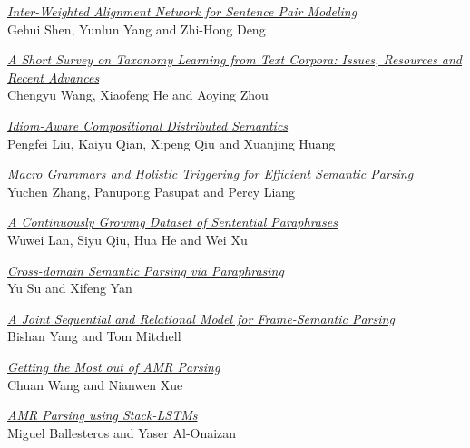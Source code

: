 \hyperlink{page.1188}{\em Inter-Weighted Alignment Network for Sentence Pair Modeling}\samepage \\
\hspace*{7mm} Gehui Shen, Yunlun Yang and Zhi-Hong Deng\dotfill {}

\hyperlink{page.1199}{\em A Short Survey on Taxonomy Learning from Text Corpora: Issues, Resources and Recent Advances}\samepage \\
\hspace*{7mm} Chengyu Wang, Xiaofeng He and Aoying Zhou\dotfill {}

\hyperlink{page.1213}{\em Idiom-Aware Compositional Distributed Semantics}\samepage \\
\hspace*{7mm} Pengfei Liu, Kaiyu Qian, Xipeng Qiu and Xuanjing Huang\dotfill {}

\hyperlink{page.1223}{\em Macro Grammars and Holistic Triggering for Efficient Semantic Parsing}\samepage \\
\hspace*{7mm} Yuchen Zhang, Panupong Pasupat and Percy Liang\dotfill {}

\hyperlink{page.1233}{\em A Continuously Growing Dataset of Sentential Paraphrases}\samepage \\
\hspace*{7mm} Wuwei Lan, Siyu Qiu, Hua He and Wei Xu\dotfill {}

\hyperlink{page.1244}{\em Cross-domain Semantic Parsing via Paraphrasing}\samepage \\
\hspace*{7mm} Yu Su and Xifeng Yan\dotfill {}

\hyperlink{page.1256}{\em A Joint Sequential and Relational Model for Frame-Semantic Parsing}\samepage \\
\hspace*{7mm} Bishan Yang and Tom Mitchell\dotfill {}

\hyperlink{page.1266}{\em Getting the Most out of AMR Parsing}\samepage \\
\hspace*{7mm} Chuan Wang and Nianwen Xue\dotfill {}

\hyperlink{page.1278}{\em AMR Parsing using Stack-LSTMs}\samepage \\
\hspace*{7mm} Miguel Ballesteros and Yaser Al-Onaizan\dotfill {}

